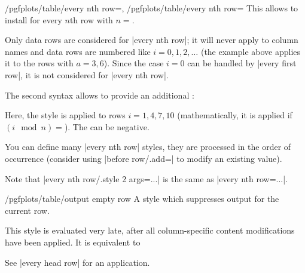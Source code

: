 \documentclass[a4paper]{ltxdoc}
\begin{document}
\begin{keylist}{%
    /pgfplots/table/every nth row=,
    /pgfplots/table/every nth row=%
}
    This allows to install  for every $n$th row with
    $n=$.
\begin{codeexample}[]
\end{codeexample}
    Only data rows are considered for |every nth row|; it will never apply to
    column names and data rows are numbered like $i=0,1,2,\dotsc$ (the example
    above applies it to the rows with $a = 3,6$). Since the case $i=0$ can be
    handled by |every first row|, it is not considered for |every nth row|.

    The second syntax allows to provide an additional :
\begin{codeexample}[]
\end{codeexample}
    \noindent Here, the style is applied to rows $i=1,4,7,10$ (mathematically,
    it is applied if $(i \mod n) = $). The  can
    be negative.

    You can define many |every nth row| styles, they are processed in the order
    of occurrence (consider using |before row/.add=| to modify an existing value).

    Note that |every nth row/.style 2 args=...| is the same as
    |every nth row=...|.
\end{keylist}

\begin{stylekey}{/pgfplots/table/output empty row}
    A style which suppresses output for the current row.

    This style is evaluated very late, after all column-specific content
    modifications have been applied. It is equivalent to
\begin{codeexample}
\end{codeexample}

    See |every head row| for an application.
\end{stylekey}
\end{document}
